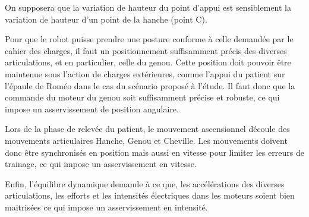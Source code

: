 \documentclass[10pt]{article}
\begin{document}
\begin{minipage}[c]{.6\linewidth}
On supposera que la variation de hauteur du point d'appui est sensiblement la variation de hauteur d'un point de la hanche (point C).

Pour que le robot puisse prendre une posture conforme à celle demandée par le cahier des charges, il faut un positionnement suffisamment précis des diverses articulations, et en particulier, celle du genou. Cette position doit pouvoir être maintenue sous l'action de charges extérieures, comme l'appui du patient sur l'épaule de Roméo dans le cas du scénario proposé à l'étude.
Il faut donc que la commande du moteur du genou soit suffisamment précise et robuste, ce qui impose un asservissement de position angulaire.

Lors de la phase de relevée du patient, le mouvement ascensionnel découle des mouvements articulaires Hanche, Genou et Cheville. Les mouvements doivent donc être synchronisés en position mais aussi en vitesse pour limiter les erreurs de trainage, ce qui impose un asservissement en vitesse.


Enfin, l'équilibre dynamique demande à ce que, les accélérations des diverses articulations, les efforts et les intensités électriques dans les moteurs soient bien maitrisées ce qui impose un asservissement en intensité.

\end{minipage} \hfill
\end{document}
